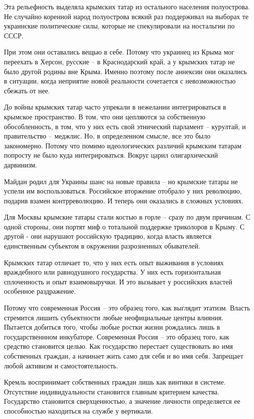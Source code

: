 Эта рельефность выделяла крымских татар из остального населения полуострова. Не
случайно коренной народ полуострова всякий раз поддерживал на выборах те
украинские политические силы, которые не спекулировали на ностальгии по СССР. 

При этом они оставались вещью в себе. Потому что украинец из Крыма мог
переехать в Херсон, русские – в Краснодарский край, а у крымских татар не было
другой родины вне Крыма. Именно поэтому после аннексии они оказались в
ситуации, когда неприятие новой реальности сочетается с невозможностью сбежать
от нее. 

До войны крымских татар часто упрекали в нежелании интегрироваться в крымское
пространство. В том, что они цепляются за собственную обособленность, в том,
что у них есть свой этнический парламент – курултай, и правительство – меджлис.
Но, в определенном смысле, все это было закономерно. Потому что помимо
идеологических различий крымским татарам попросту не было куда интегрироваться.
Вокруг царил олигархический дарвинизм.

Майдан родил для Украины шанс на новые правила – но крымские татары не успели
им воспользоваться. Российское вторжение отобрало у них революцию, подарив
взамен контрреволюцию. И теперь они оказались в сложных условиях.

Для Москвы крымские татары стали костью в горле – сразу по двум причинам. С
одной стороны, они портят миф о тотальной поддержке триколоров в Крыму. С
другой - они нарушают российскую традицию, когда власть является единственным
субъектом в окружении разрозненных обывателей. 

Крымских татар отличает то, что у них есть опыт выживания в условиях
враждебного или равнодушного государства. У них есть горизонтальная
сплоченность и опыт взаимовыручки. И это вызывает у российских властей
особенное раздражение. 

Потому что современная Россия – это образец того, как выглядит этатизм. Власть
стремится лишить субъектности любые неофициальные центры влияния.  Пытается
добиться того, чтобы любые ростки жизни рождались лишь в государственнном
инкубаторе. Современная Россия – это образец того, как средство становится
целью. Как государство перестает существовать во имя собственных граждан, а
начинает жить само для себя и во имя себя. Запрещает любой активизм и
самостоятельность. 

Кремль воспринимает собственных граждан лишь как винтики в системе. Отсутствие
индивидуальности становится главным критерием качества. Государство становится
сверхценностью, а значение личности определяется ее способностью находиться на
службе у вертикали. 

